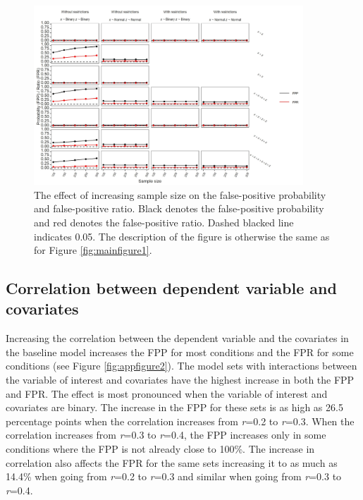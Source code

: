 \begin{figure}[hbt!]
\includegraphics[width=0.9\textwidth]{R/Analysis/Result/Figures/Figure1D.jpeg}
\centering
\caption{The effect of increasing sample size on the false-positive probability and false-positive ratio. Black denotes the false-positive probability and red denotes the false-positive ratio. Dashed blacked line indicates 0.05. The description of the figure is otherwise the same as for Figure \ref{fig:mainfigure1}.}
\label{fig:mainfigure4}
\end{figure}

\subsection{Correlation between dependent variable and covariates}
Increasing the correlation between the dependent variable and the covariates in the baseline model increases the FPP for most conditions and the FPR for some conditions (see Figure \ref{fig:appfigure2}). The model sets with interactions between the variable of interest and covariates have the highest increase in both the FPP and FPR. The effect is most pronounced when the variable of interest and covariates are binary. The increase in the FPP for these sets is as high as 26.5 percentage points when the correlation increases from \textit{r}=0.2 to \textit{r}=0.3. When the correlation increases from \textit{r}=0.3 to \textit{r}=0.4, the FPP increases only in some conditions where the FPP is not already close to 100\%. The increase in correlation also affects the FPR for the same sets increasing it to as much as 14.4\% when going from \textit{r}=0.2 to \textit{r}=0.3 and similar when going from \textit{r}=0.3 to \textit{r}=0.4. 